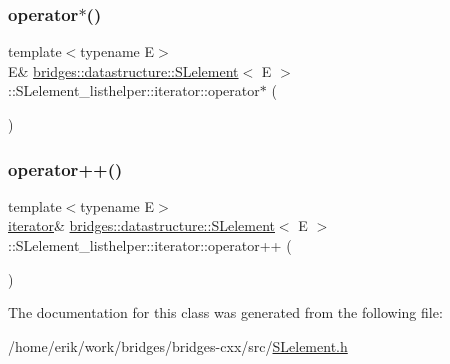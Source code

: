 \subsubsection{\texorpdfstring{operator$\ast$()}{operator*()}\hspace{0.1cm}{\footnotesize\ttfamily [2/2]}}
{\footnotesize\ttfamily template$<$typename E$>$ \\
E\& \hyperlink{classbridges_1_1datastructure_1_1_s_lelement}{bridges\+::datastructure\+::\+S\+Lelement}$<$ E $>$\+::S\+Lelement\+\_\+listhelper\+::iterator\+::operator$\ast$ (\begin{DoxyParamCaption}{ }\end{DoxyParamCaption})\hspace{0.3cm}{\ttfamily [inline]}}

\mbox{\label{classbridges_1_1datastructure_1_1_s_lelement_1_1_s_lelement__listhelper_1_1iterator_ab5847041e6e49fa6bcfd5efe6d2a1e1a}} 
\subsubsection{\texorpdfstring{operator++()}{operator++()}}
{\footnotesize\ttfamily template$<$typename E$>$ \\
\hyperlink{classbridges_1_1datastructure_1_1_s_lelement_1_1_s_lelement__listhelper_1_1iterator}{iterator}\& \hyperlink{classbridges_1_1datastructure_1_1_s_lelement}{bridges\+::datastructure\+::\+S\+Lelement}$<$ E $>$\+::S\+Lelement\+\_\+listhelper\+::iterator\+::operator++ (\begin{DoxyParamCaption}{ }\end{DoxyParamCaption})\hspace{0.3cm}{\ttfamily [inline]}}



The documentation for this class was generated from the following file\+:\begin{DoxyCompactItemize}
\item 
/home/erik/work/bridges/bridges-\/cxx/src/\hyperlink{_s_lelement_8h}{S\+Lelement.\+h}\end{DoxyCompactItemize}
